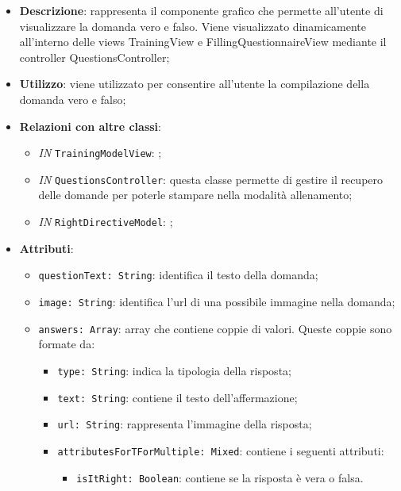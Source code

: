 		\begin{itemize}
			\item \textbf{Descrizione}: rappresenta il componente grafico che permette all'utente di visualizzare la domanda vero e falso. Viene visualizzato dinamicamente all'interno delle views TrainingView e FillingQuestionnaireView mediante il controller QuestionsController;
			\item \textbf{Utilizzo}: viene utilizzato per consentire all'utente la compilazione della domanda vero e falso;
			\item \textbf{Relazioni con altre classi}: 
			\begin{itemize}
				\item \textit{IN} \texttt{TrainingModelView}: ; 
				\item \textit{IN} \texttt{QuestionsController}: questa classe permette di gestire il recupero delle domande per poterle stampare nella modalità allenamento;
				\item \textit{IN} \texttt{RightDirectiveModel}: ;
			\end{itemize}
			\item \textbf{Attributi}: 
			\begin{itemize}
				\item \texttt{questionText: String}: identifica il testo della domanda;
				\item \texttt{image: String}: identifica l'url di una possibile immagine nella domanda;
				\item \texttt{answers: Array}: array che contiene coppie di valori. Queste coppie sono formate da:
				\begin{itemize}
					\item \texttt{type: String}: indica la tipologia della risposta;
					\item \texttt{text: String}: contiene il testo dell'affermazione;
					\item \texttt{url: String}: rappresenta l'immagine della risposta;
					\item \texttt{attributesForTForMultiple: Mixed}: contiene i seguenti attributi:
					\begin{itemize}
						\item \texttt{isItRight: Boolean}: contiene se la risposta è vera o falsa.
					\end{itemize}
				\end{itemize}
			\end{itemize}
		\end{itemize}																	